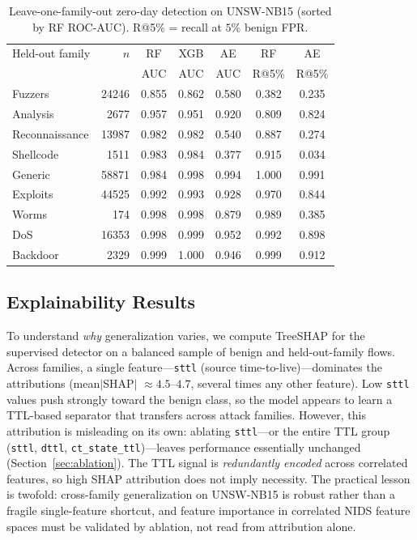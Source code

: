 \documentclass[conference]{IEEEtran}
\begin{document}
\begin{table}[t]
\caption{Leave-one-family-out zero-day detection on UNSW-NB15
(sorted by RF ROC-AUC). R@5\% = recall at $5\%$ benign FPR.}
\label{tab:loo}
\centering
\small
\setlength{\tabcolsep}{4pt}
\begin{tabular}{lrccccc}
\toprule
Held-out family & $n$ & RF & XGB & AE & RF & AE \\
 & & AUC & AUC & AUC & R@5\% & R@5\% \\
\midrule
Fuzzers        & 24246 & 0.855 & 0.862 & 0.580 & 0.382 & 0.235 \\
Analysis       & 2677  & 0.957 & 0.951 & 0.920 & 0.809 & 0.824 \\
Reconnaissance & 13987 & 0.982 & 0.982 & 0.540 & 0.887 & 0.274 \\
Shellcode      & 1511  & 0.983 & 0.984 & 0.377 & 0.915 & 0.034 \\
Generic        & 58871 & 0.984 & 0.998 & 0.994 & 1.000 & 0.991 \\
Exploits       & 44525 & 0.992 & 0.993 & 0.928 & 0.970 & 0.844 \\
Worms          & 174   & 0.998 & 0.998 & 0.879 & 0.989 & 0.385 \\
DoS            & 16353 & 0.998 & 0.999 & 0.952 & 0.992 & 0.898 \\
Backdoor       & 2329  & 0.999 & 1.000 & 0.946 & 0.999 & 0.912 \\
\bottomrule
\end{tabular}
\end{table}

\subsection{Explainability Results}
To understand \emph{why} generalization varies, we compute TreeSHAP for the
supervised detector on a balanced sample of benign and held-out-family flows.
Across families, a single feature---\texttt{sttl} (source time-to-live)---dominates
the attributions (mean$|$SHAP$|$ $\approx 4.5$--$4.7$, several times any other
feature). Low \texttt{sttl} values push strongly toward the benign class, so the
model appears to learn a TTL-based separator that transfers across attack families.
However, this attribution is misleading on its own: ablating \texttt{sttl}---or the
entire TTL group (\texttt{sttl}, \texttt{dttl}, \texttt{ct\_state\_ttl})---leaves
performance essentially unchanged (Section~\ref{sec:ablation}). The TTL signal is
\emph{redundantly encoded} across correlated features, so high SHAP attribution does
not imply necessity. The practical lesson is twofold: cross-family generalization on
UNSW-NB15 is robust rather than a fragile single-feature shortcut, and feature
importance in correlated NIDS feature spaces must be validated by ablation, not read
from attribution alone.
\end{document}
